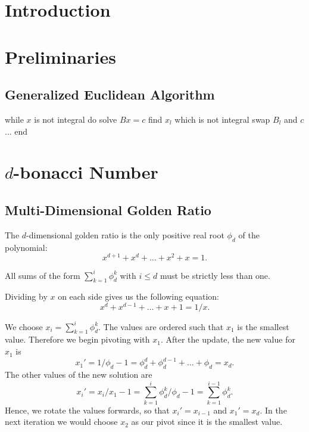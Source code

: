 \documentclass[english,version-2020-11]{uzl-thesis}
\begin{document}
\chapter{Introduction}

\chapter{Preliminaries}

\section{Generalized Euclidean Algorithm}

\begin{Pseudocode}
while $x$ is not integral do
  solve $Bx = c$
  find $x_l$ which is not integral
  swap $B_l$ and $c$
  ...
end
\end{Pseudocode}

\chapter{$d$-bonacci Number}

\section{Multi-Dimensional Golden Ratio}

\begin{definition}
  The $d$-dimensional golden ratio is the only positive real root $\phi_d$ of the polynomial:
  \[
    x^{d+1} + x^d + \dots + x^2 + x = 1.
  \]
\end{definition}

All sums of the form $\sum_{k=1}^i \phi_d^k$ with $i \le d$ must be strictly less than one.

Dividing by $x$ on each side gives us the following equation:
\[
  x^d + x^{d-1} + \dots + x + 1 = 1/x.
\]

We choose $x_i = \sum_{k = 1}^i \phi_d^k$.
The values are ordered such that $x_1$ is the smallest value.
Therefore we begin pivoting with $x_1$.
After the update, the new value for $x_1$ is
\[
  x_1' = 1/\phi_d - 1 = \phi_d^d + \phi_d^{d-1} + \dots + \phi_d = x_d.
\]
The other values of the new solution are
\[
  x_i' = x_i / x_1 - 1 = \sum_{k = 1}^i \phi_d^k / \phi_d - 1 = \sum_{k=1}^{i-1} \phi_d^k.
\]
Hence, we rotate the values forwards, so that $x_i' = x_{i-1}$ and $x_1' = x_d$.
In the next iteration we would choose $x_2$ as our pivot since it is the smallest value.
\end{document}
